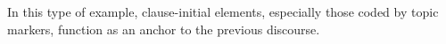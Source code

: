 
In this type of example,
clause-initial elements, especially those coded by topic markers, function as an anchor to the previous discourse.

